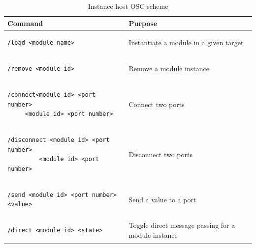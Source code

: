 \documentclass[10pt,journal,final]{IEEEtran}
\newcommand\T{\rule{0pt}{2.6ex}}
\newcommand\TT{\rule{0pt}{3.6ex}}
\newcommand\B{\rule[-1.2ex]{0pt}{0pt}}
\newcommand\BB{\rule[-2.2ex]{0pt}{0pt}}
\begin{document}
\begin{table}
\caption{Instance host OSC scheme}
\begin{center}
\begin{tabular}{|p{27em}|p{21.5em}|}
\hline
\textbf{Command} \T \B & \textbf{Purpose} \\
\hline
\begin{minipage}[0pt]{20em}
\small {
\begin{verbatim}/load <module-name>\end{verbatim}} \end{minipage} \T & \small{Instantiate a module in a given target} \\
\hline
\begin{minipage}[0pt]{20em}
  \small {
\begin{verbatim}
/remove <module id>
\end{verbatim} 
}
 \end{minipage} \T
& \small{Remove a module instance} \\
\hline
\begin{minipage}[0pt]{20em}
\small {
\begin{verbatim}
/connect<module id> <port number> 
     <module id> <port number> 
\end{verbatim} 
}
 \end{minipage} \TT
& \small{Connect two ports} \BB \\
\hline
\begin{minipage}[0pt]{20em}
\small {
\begin{verbatim}
/disconnect <module id> <port number> 
         <module id> <port number> 
\end{verbatim}
}
 \end{minipage} \TT
& \small{Disconnect two ports} \BB \\
\hline
\begin{minipage}[0pt]{20em}
\small {
\begin{verbatim}/send <module id> <port number> <value> 
\end{verbatim} 
}
 \end{minipage} \T
& \small{Send a value to a port} \\
\hline
\begin{minipage}[0pt]{20em}
\small {
\begin{verbatim}
/direct <module id> <state> \end{verbatim}
} \end{minipage} \T
& \small{Toggle direct message passing for a module instance} \BB \\ 
\hline
\end{tabular} 
\end{center}
\label{tab:lib_namespace}
\end{table}
\end{document}

